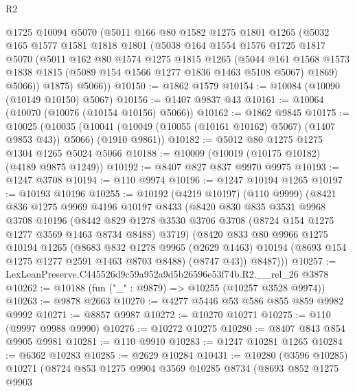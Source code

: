 \begin{lexlean}{R2}
\begin{coremodule}
      @1725
      @10094
      @5070
      (@5011
        @166
        @80
        @1582
        @1275
        @1801
        @1265
        (@5032
          @165
          @1577
          @1581
          @1818
          @1801
          (@5038
            @164
            @1554
            @1576
            @1725
            @1817
            @5070
            (@5011
              @162
              @80
              @1574
              @1275
              @1815
              @1265
              (@5044
                @161
                @1568
                @1573
                @1838
                @1815
                (@5089 @154 @1566 @1277 @1836 @1463 @5108 @5067)
                @1869)
              @5066))
          @1875)
        @5066))
@10150 := @1862 @1579
@10154 := @10084 (@10090 (@10149 @10150) @5067)
@10156 := @1407 @9837 @43
@10161 := @10064 (@10070 (@10076 (@10154 @10156) @5066))
@10162 := @1862 @9845
@10175 := @10025
    (@10035 (@10041 (@10049 (@10055 (@10161 @10162) @5067) (@1407 @9853 @43)) @5066) (@1910 @9861))
@10182 := @5012 @80 @1275 @1275 @1304 @1265 @5024 @5066
@10188 := @10009 (@10019 (@10175 @10182) (@4189 @9875 @1249))
@10192 := @8407 @827 @837 @9970 @9975
@10193 := @1247 @3708
@10194 := @110 @9974
@10196 := @1247 @10194 @1265
@10197 := @10193 @10196
@10255 := @10192
    (@4219 @10197)
    (@110 @9999)
    (@8421
      @836
      @1275
      @9969
      @4196
      @10197
      @8433
      (@8420
        @830
        @835
        @3531
        @9968
        @3708
        @10196
        (@8442 @829 @1278 @3530 @3706 @3708 (@8724 @154 @1275 @1277 @3569 @1463 @8734 @8488) @3719)
        (@8420
          @833
          @80
          @9966
          @1275
          @10194
          @1265
          (@8683
            @832
            @1278
            @9965
            (@2629 @1463)
            @10194
            (@8693 @154 @1275 @1277 @2591 @1463 @8703 @8488)
            (@8747 @43))
          @8487)))
@10257 := LexLeanPreserve.C445526d9c59a952a9d5b26596e53f74b.R2.__rel_26 @3878
@10262 := @10188 (fun ("_" : @9879) => @10255 (@10257 @3528 @9974))
@10263 := @9878 @2663
@10270 := @4277 @5446 @53 @586 @855 @859 @9982 @9992
@10271 := @8857 @9987
@10272 := @10270 @10271
@10275 := @110 (@9997 @9988 @9990)
@10276 := @10272 @10275
@10280 := @8407 @843 @854 @9905 @9981
@10281 := @110 @9910
@10283 := @1247 @10281 @1265
@10284 := @6362 @10283
@10285 := @2629 @10284
@10431 := @10280
    (@3596 @10285)
    @10271
    (@8724
      @853
      @1275
      @9904
      @3569
      @10285
      @8734
      (@8693
        @852
        @1275
        @9903

\end{coremodule}
\end{lexlean}

